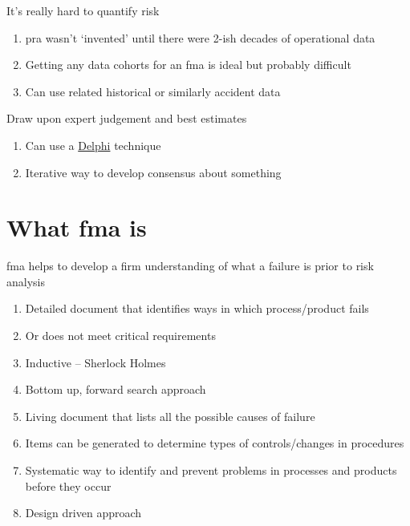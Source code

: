 \documentclass[aspectratio=1610,pdftex,dvipsnames,compress,xcolor={dvipsnames}]{beamer}
\newcommand{\acs}{\acrshort} %
\begin{document}
\begin{frame}{It's really hard to quantify risk}
    \begin{enumerate}[series=outerlist,topsep=0pt,itemsep=21pt,leftmargin=*,label=(\arabic*)]
        \item[]\acs{pra} wasn't `invented' until there were 2-ish decades of operational data
        \item[]Getting any data cohorts for an \acs{fma} is ideal but probably difficult 
        \item[]Can use related historical or similarly accident data
    \end{enumerate}
\end{frame}


\begin{frame}{Draw upon expert judgement and best estimates}
    \begin{enumerate}[series=outerlist,topsep=0pt,itemsep=21pt,leftmargin=*,label=(\arabic*)]
        \item[]Can use a \href{https://uidaho.pressbooks.pub/riskassessment/chapter/failure-rates/}{Delphi} technique
        \item[]Iterative way to develop consensus about something
    \end{enumerate}
\end{frame}


\section{What \acs{fma} is}


\addtocounter{framenumber}{-1}
\begin{frame}{\acs{fma} helps to develop a firm understanding of what a failure is prior to risk analysis}
    \begin{enumerate}[series=outerlist,topsep=0pt,itemsep=11pt,leftmargin=*,label=(\arabic*)]
        \item[]Detailed document that identifies ways in which process/product fails
        \item[]Or does not meet critical requirements
        \item[]Inductive -- Sherlock Holmes  
        \item[]Bottom up, forward search approach
        \item[]Living document that lists all the possible causes of failure
        \item[]Items can be generated to determine types of controls/changes in procedures 
        \item[]Systematic way to identify and prevent problems in processes and products before they occur  
        \item[]Design driven approach
    \end{enumerate}
\end{frame}
\end{document}
